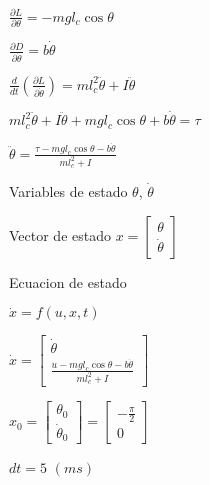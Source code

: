\documentclass{article}
\begin{document}
$\frac{\partial L}{\partial \theta }=-mgl_{c}\cos \theta $

$\frac{\partial D}{\partial \dot{\theta}}=b\dot{\theta}$

$\frac{d}{dt}\left( \frac{\partial L}{\partial \dot{\theta}}\right)
=ml_{c}^{2}\ddot{\theta}+I\ddot{\theta}$

$ml_{c}^{2}\ddot{\theta}+I\ddot{\theta}+mgl_{c}\cos \theta +b\dot{\theta}%
=\tau $

$\ddot{\theta}=\frac{\tau -mgl_{c}\cos \theta -b\dot{\theta}}{ml_{c}^{2}+I}$

Variables de estado $\theta $, $\dot{\theta}$

Vector de estado $x=\left[ 
\begin{array}{c}
\theta  \\ 
\dot{\theta}%
\end{array}%
\right] $

Ecuacion de estado

$\dot{x}=f\left( u,x,t\right) $

$\dot{x}=\left[ 
\begin{array}{c}
\dot{\theta} \\ 
\frac{u-mgl_{c}\cos \theta -b\dot{\theta}}{ml_{c}^{2}+I}%
\end{array}%
\right] $

$x_{0}=\left[ 
\begin{array}{c}
\theta _{0} \\ 
\dot{\theta}_{0}%
\end{array}%
\right] =\left[ 
\begin{array}{c}
-\frac{\pi }{2} \\ 
0%
\end{array}%
\right] $

$dt=5$ $(ms)$
\end{document}
